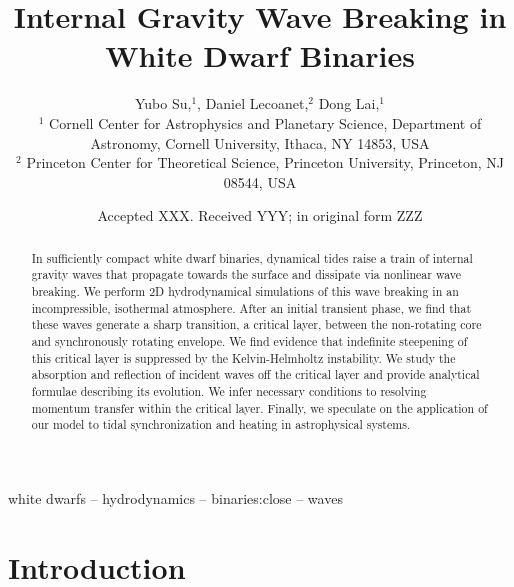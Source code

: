 \documentclass[
        fleqn,
        usenatbib,
        referee,
    ]{mnras}
\title[Internal Gravity Wave Breaking in White Dwarf Binaries]{Internal Gravity
Wave Breaking in White Dwarf Binaries}
\author[Y. Su et\ al.]{
Yubo Su,$^1$,
Daniel Lecoanet,$^2$
Dong Lai,$^1$
\\
$^1$ Cornell Center for Astrophysics and Planetary Science, Department of
Astronomy, Cornell University, Ithaca, NY 14853, USA
\\
$^2$ Princeton Center for Theoretical Science, Princeton University, Princeton,
NJ 08544, USA
}
\date{Accepted XXX\@. Received YYY\@; in original form ZZZ}
\begin{document}
\label{firstpage}
\pagerange{\pageref{firstpage}--\pageref{lastpage}}
\renewcommand*{\sectionautorefname}{Section}
\maketitle


\begin{abstract}
    In sufficiently compact white dwarf binaries, dynamical tides raise a train
    of internal gravity waves that propagate towards the surface and dissipate
    via nonlinear wave breaking. We perform 2D hydrodynamical simulations of
    this wave breaking in an incompressible, isothermal atmosphere. After an
    initial transient phase, we find that these waves generate a sharp
    transition, a critical layer, between the non-rotating core and
    synchronously rotating envelope. We find evidence that indefinite steepening
    of this critical layer is suppressed by the Kelvin-Helmholtz instability. We
    study the absorption and reflection of incident waves off the critical layer
    and provide analytical formulae describing its evolution. We infer
    necessary conditions to resolving momentum transfer within the critical
    layer. Finally, we speculate on the application of our model to tidal
    synchronization and heating in astrophysical systems.
\end{abstract}

\begin{keywords}
white dwarfs -- hydrodynamics -- binaries:close -- waves %
\end{keywords}

\section{Introduction}
\end{document}
